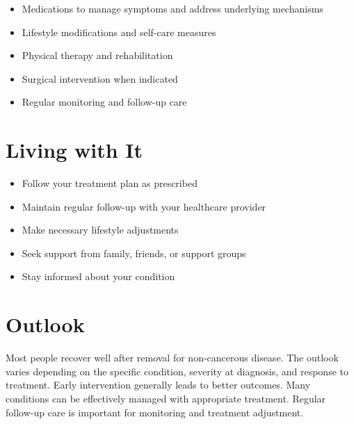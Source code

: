 \begin{itemize}[noitemsep]
  \item Medications to manage symptoms and address underlying mechanisms
  \item Lifestyle modifications and self-care measures
  \item Physical therapy and rehabilitation
  \item Surgical intervention when indicated
  \item Regular monitoring and follow-up care
\end{itemize}
\section{Living with It}
\begin{itemize}[noitemsep]
  \item Follow your treatment plan as prescribed
  \item Maintain regular follow-up with your healthcare provider
  \item Make necessary lifestyle adjustments
  \item Seek support from family, friends, or support groups
  \item Stay informed about your condition
\end{itemize}
\section{Outlook}
Most people recover well after removal for non-cancerous disease. The outlook varies depending on the specific condition, severity at diagnosis, and response to treatment. Early intervention generally leads to better outcomes. Many conditions can be effectively managed with appropriate treatment. Regular follow-up care is important for monitoring and treatment adjustment.
